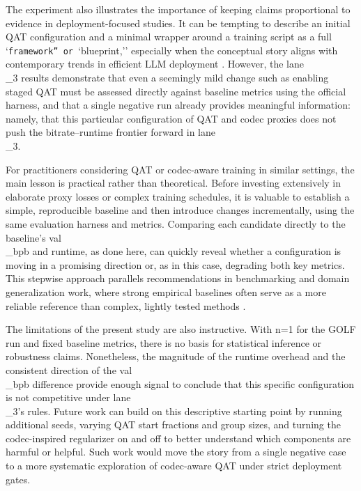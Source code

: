 \documentclass{article}
\begin{document}
The experiment also illustrates the importance of keeping claims proportional to evidence in deployment-focused studies. It can be tempting to describe an initial QAT configuration and a minimal wrapper around a training script as a full `\texttt{framework'' or }`blueprint,'' especially when the conceptual story aligns with contemporary trends in efficient LLM deployment \cite{frantar2022gptq, dettmers2022llm, lin2023awq}. However, the lane\\_3 results demonstrate that even a seemingly mild change such as enabling staged QAT must be assessed directly against baseline metrics using the official harness, and that a single negative run already provides meaningful information: namely, that this particular configuration of QAT and codec proxies does not push the bitrate--runtime frontier forward in lane\\_3.

For practitioners considering QAT or codec-aware training in similar settings, the main lesson is practical rather than theoretical. Before investing extensively in elaborate proxy losses or complex training schedules, it is valuable to establish a simple, reproducible baseline and then introduce changes incrementally, using the same evaluation harness and metrics. Comparing each candidate directly to the baseline's val\\_bpb and runtime, as done here, can quickly reveal whether a configuration is moving in a promising direction or, as in this case, degrading both key metrics. This stepwise approach parallels recommendations in benchmarking and domain generalization work, where strong empirical baselines often serve as a more reliable reference than complex, lightly tested methods \cite{teterwak2023improved, liu2022bond}.

The limitations of the present study are also instructive. With n=1 for the GOLF run and fixed baseline metrics, there is no basis for statistical inference or robustness claims. Nonetheless, the magnitude of the runtime overhead and the consistent direction of the val\\_bpb difference provide enough signal to conclude that this specific configuration is not competitive under lane\\_3's rules. Future work can build on this descriptive starting point by running additional seeds, varying QAT start fractions and group sizes, and turning the codec-inspired regularizer on and off to better understand which components are harmful or helpful. Such work would move the story from a single negative case to a more systematic exploration of codec-aware QAT under strict deployment gates.
\end{document}
